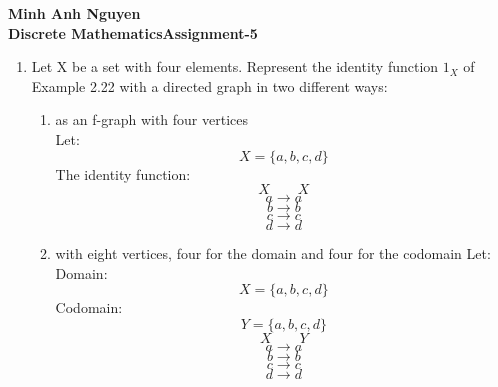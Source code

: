 \documentclass[12pt]{article}
\begin{document}
\textbf{Minh Anh Nguyen }\\
\textbf{Discrete Mathematics\hfill Assignment-5}

\hrulefill

\begin{enumerate}
      \item Let X be a set with four elements. Represent the identity function $1_X$ of Example 2.22 with a directed graph in two different ways:
      \begin{enumerate}
            \item as an f-graph with four vertices\\
            Let:
                  \[X = \{a,b,c,d\}\]
            The identity function:
            \[X \text{~~~~~~} X\]
            \[a \longrightarrow a\]
            \[b \longrightarrow b\]
            \[c \longrightarrow c\]
            \[d \longrightarrow d\]
            \item with eight vertices, four for the domain and four for the codomain
            Let:\\
                  Domain: \[X = \{a,b,c,d\}\]
                  Codomain: \[Y = \{a,b,c,d\}\]
            \[X \text{~~~~~~} Y\]
            \[a \longrightarrow a\]
            \[b \longrightarrow b\]
            \[c \longrightarrow c\]
            \[d \longrightarrow d\]
      \end{enumerate}


\end{enumerate}
\end{document}
